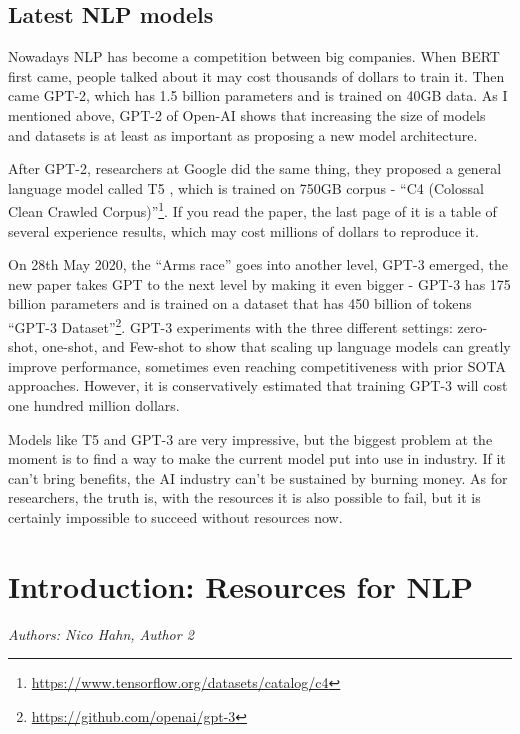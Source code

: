 \documentclass[]{krantz}
\renewcommand{\href}[2]{#2\footnote{\url{#1}}}
\begin{document}
\hypertarget{latest-nlp-models}{%
\section{Latest NLP models}\label{latest-nlp-models}}

Nowadays NLP has become a competition between big companies. When BERT first came, people talked about it may cost thousands of dollars to train it. Then came GPT-2, which has 1.5 billion parameters and is trained on 40GB data. As I mentioned above, GPT-2 of Open-AI shows that increasing the size of models and datasets is at least as important as proposing a new model architecture.

After GPT-2, researchers at Google did the same thing, they proposed a general language model called T5 \citet{raffel2019exploring}, which is trained on 750GB corpus - \href{https://www.tensorflow.org/datasets/catalog/c4}{``C4 (Colossal Clean Crawled Corpus)''}. If you read the paper, the last page of it is a table of several experience results, which may cost millions of dollars to reproduce it.

On 28th May 2020, the ``Arms race'' goes into another level, GPT-3 \citet{brown2020language} emerged, the new paper takes GPT to the next level by making it even bigger - GPT-3 has 175 billion parameters and is trained on a dataset that has 450 billion of tokens \href{https://github.com/openai/gpt-3}{``GPT-3 Dataset''}. GPT-3 experiments with the three different settings: zero-shot, one-shot, and Few-shot to show that scaling up language models can greatly improve performance, sometimes even reaching competitiveness with prior SOTA approaches. However, it is conservatively estimated that training GPT-3 will cost one hundred million dollars.

Models like T5 and GPT-3 are very impressive, but the biggest problem at the moment is to find a way to make the current model put into use in industry. If it can't bring benefits, the AI industry can't be sustained by burning money. As for researchers, the truth is, with the resources it is also possible to fail, but it is certainly impossible to succeed without resources now.

\hypertarget{introduction-resources-for-nlp}{%
\chapter{Introduction: Resources for NLP}\label{introduction-resources-for-nlp}}

\emph{Authors: Nico Hahn, Author 2}
\end{document}
